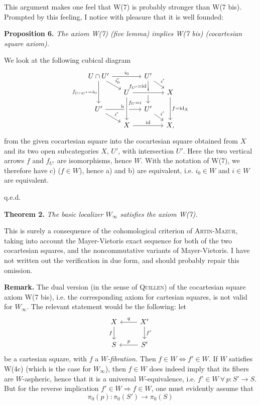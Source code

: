 This argument makes one feel that W(7) is probably stronger than W(7 bis). Prompted by this feeling, I notice with pleasure that it is well founded:


\textbf{Proposition 6.} \textit{The axiom \textup{W(7)} (five lemma) implies \textup{W(7 bis)} (cocartesian square axiom).}

We look at the following cubical diagram
\[
\begin{tikzcd}[row sep=small, column sep=small]
U\cap U' \arrow[rr, "i_0"] \arrow[dr, "i'_0"] \arrow[dd, "f_{U\cap U'}=i_0"'] & & U' \arrow[dr, "i'"] \arrow[dd, "f_{U'}=\mathrm{id}"{swap,pos=.25}] & \\
& U \arrow[rr, crossing over, "i"] & & X \arrow[dd, "f=\mathrm{id}_X"] \\
U' \arrow[rr, "\mathrm{id}"] \arrow[dr, "i'"] & & U' \arrow[dr, "i'"] & \\
& X \arrow[rr, "\mathrm{id}"] \arrow[from=uu, crossing over, "f_U=i"{pos=.25}] & & X,
\end{tikzcd}
\]
from the given cocartesian square into the cocartesian square obtained from $X$ and its two open subcategories $X$, $U'$, with intersection $U'$. Here the two vertical arrows $f$ and $f_{U'}$ are isomorphisms, hence $W$. With the notation of W(7), we therefore have c) ($f\in W$), hence a) and b) are equivalent, i.e. $i_0\in W$ and $i\in W$ are equivalent.

\hfill q.e.d.

\textbf{Theorem 2.} \textit{The basic localizer $W_\infty$ satisfies the axiom \textup{W(7)}.}

This is surely a consequence of the cohomological criterion of \textsc{Artin-Mazur}, taking into account the Mayer-Vietoris exact sequence for both of the two cocartesian squares, and the noncommutative variants of Mayer-Vietoris. I have not written out the verification in due form, and should probably repair this omission.

\textbf{Remark.} The dual version (in the sense of \textsc{Quillen}) of the cocartesian square axiom W(7 bis), i.e. the corresponding axiom for cartesian squares, is not valid for $W_\infty$. The relevant statement would be the following: let
\[
\begin{tikzcd}
X & X' \arrow[l, "q"'] \arrow[d, "f'"] \\
S & S' \arrow[l, "p"']
\arrow[from=1-1, to=2-1, "f"']
\end{tikzcd}
\]
be a cartesian square, with $f$ a \textit{$W$-fibration.} Then $f\in W\Longleftrightarrow f'\in W$. If $W$ satisfies W(4c) (which is the case for $W_\infty$), then $f\in W$ does indeed imply that its fibers are $W$-aspheric, hence that it is a universal $W$-equivalence, i.e. $f'\in W\ \forall\, p:S'\longrightarrow S$. But for the reverse implication $f'\in W\Longrightarrow f\in W$, one must evidently assume that
\[
\pi_0(p):\pi_0(S')\longrightarrow\pi_0(S)
\]
